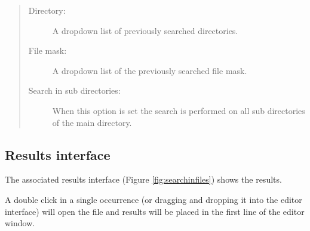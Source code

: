\begin{quote}
  \begin{footnotesize}
    \begin{description}
      \item[Directory:]
        A dropdown list of previously searched directories.
      \item[File mask:]
        A dropdown list of the previously searched file mask.
      \item[Search in sub directories:]
        When this option is set the search is performed on all sub
        directories of the main directory.
    \end{description}
  \end{footnotesize}
\end{quote}


\subsection{Results interface}

The associated results interface
(Figure \ref{fig:searchinfiles})
shows the results.

A double click in a single occurrence (or dragging and dropping it into the
editor interface) will open the file and results will be placed in the first
line of the editor window.

